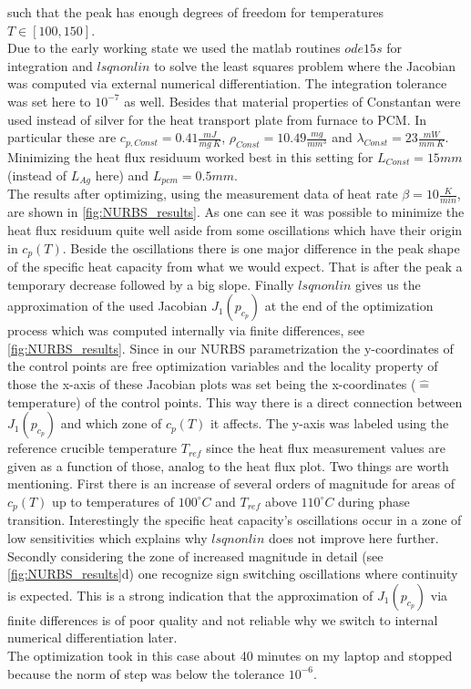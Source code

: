 \documentclass{scrartcl}[12pt, halfparskip]
\numberwithin{equation}{section}
\numberwithin{figure}{section}
\numberwithin{table}{section}
\begin{document}
such that the peak has enough degrees of freedom for temperatures $T \in [100, 150]$. \\
Due to the early working state we used the matlab routines $ode15s$ for integration and $lsqnonlin$ to solve the least squares problem where the Jacobian was computed via external numerical differentiation. The integration tolerance was set here to $10^{-7}$ as well. Besides that material properties of Constantan were used instead of silver for the heat transport plate from furnace to PCM. In particular these are $c_{p,Const}=0.41\frac{mJ}{mg \ K}$, $\rho_{Const}=10.49\frac{mg}{mm^3}$ and $\lambda_{Const}=23\frac{mW}{mm \ K}$. \\
Minimizing the heat flux residuum worked best in this setting for $L_{Const}=15mm$ (instead of $L_{Ag}$ here) and $L_{pcm}=0.5mm$. \\
The results after optimizing, using the measurement data of heat rate $\beta = 10 \frac{K}{min}$, are shown in \cref{fig:NURBS_results}. As one can see it was possible to minimize the heat flux residuum quite well aside from some oscillations which have their origin in $c_p(T)$. 
Beside the oscillations there is one major difference in the peak shape of the specific heat capacity from what we would expect. That is after the peak a temporary decrease followed by a big slope.
Finally $lsqnonlin$ gives us the approximation of the used Jacobian $J_1(p_{c_p})$ at the end of the optimization process which was computed internally via finite differences, see \cref{fig:NURBS_results}. Since in our NURBS parametrization the y-coordinates of the control points are free optimization variables and the locality property of those the x-axis of these Jacobian plots was set being the x-coordinates ($\hat{=}$ temperature) of the control points. This way there is a direct connection between $J_1(p_{c_p})$ and which zone of $c_p(T)$ it affects. The y-axis was labeled using the reference crucible temperature $T_{ref}$ since the heat flux measurement values are given as a function of those, analog to the heat flux plot.
Two things are worth mentioning. First there is an increase of several orders of magnitude for areas of $c_p(T)$ up to temperatures of $100^\circ C$ and $T_{ref}$ above $110^\circ C$ during phase transition. Interestingly the specific heat capacity's oscillations occur in a zone of low sensitivities which explains why $lsqnonlin$ does not improve here further. 
Secondly considering the zone of increased magnitude in detail (see \cref{fig:NURBS_results}d) one recognize sign switching oscillations where continuity is expected. This is a strong indication that the approximation of $J_1(p_{c_p})$ via finite differences is of poor quality and not reliable why we switch to internal numerical differentiation later. \\
The optimization took in this case about 40 minutes on my laptop and stopped because the norm of step was below the tolerance $10^{-6}$.
\end{document}
